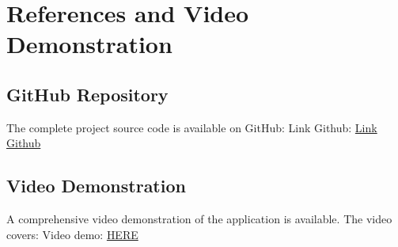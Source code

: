 \section{References and Video Demonstration}

\subsection{GitHub Repository}

The complete project source code is available on GitHub:
Link Github: \href{https://github.com/Kras2508/Shoppii}{Link Github}
\subsection{Video Demonstration}

A comprehensive video demonstration of the application is available. The video covers:
Video demo: \href{https://drive.google.com/drive/folders/1cMgkpOPPDI03eAnaNp13paADD3R0UUHk?usp=drive_link}{HERE}